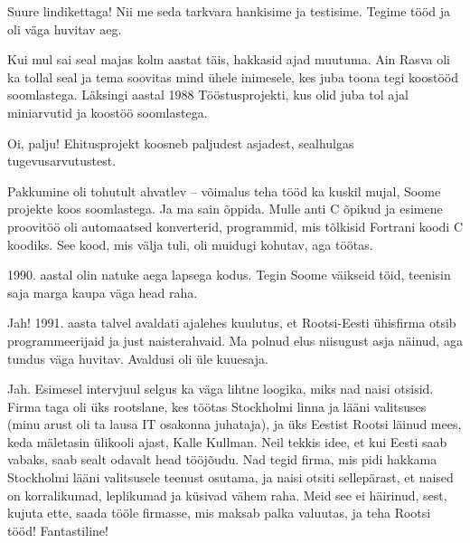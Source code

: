 
Suure lindikettaga! Nii me seda tarkvara hankisime ja testisime. Tegime tööd ja 
oli väga huvitav aeg.

Kui mul sai seal majas kolm aastat täis, hakkasid ajad muutuma. Ain 
Rasva oli ka tollal seal ja tema soovitas mind 
ühele inimesele, kes juba toona tegi koostööd soomlastega. Läksingi aastal 1988 Tööstusprojekti, kus olid juba tol ajal miniarvutid ja koostöö soomlastega. 


Oi, palju! Ehitusprojekt koosneb paljudest asjadest, sealhulgas 
tugevusarvutustest.


Pakkumine oli tohutult ahvatlev -- võimalus teha tööd ka kuskil mujal, 
Soome projekte koos 
soomlastega. Ja ma sain õppida. Mulle anti C õpikud ja 
esimene proovitöö oli automaatsed konverterid, programmid, mis tõlkisid
Fortrani koodi C koodiks. See kood, mis 
välja tuli, oli muidugi kohutav, aga töötas. 

1990. aastal olin natuke aega lapsega kodus. Tegin Soome väikseid töid, teenisin 
saja marga kaupa väga head raha. 


Jah! 1991. aasta talvel avaldati ajalehes 
kuulutus, et Rootsi-Eesti ühisfirma otsib programmeerijaid ja just naisterahvaid. Ma polnud elus niisugust asja näinud, aga tundus väga 
huvitav. Avaldusi oli üle kuuesaja. 


Jah. Esimesel intervjuul selgus ka väga lihtne loogika, miks nad naisi 
otsisid. Firma taga oli üks rootslane, kes töötas Stockholmi linna ja 
lääni valitsuses (minu arust oli ta lausa IT osakonna juhataja), ja üks Eestist Rootsi läinud mees, keda mäletasin ülikooli ajast, 
Kalle Kullman. Neil tekkis idee, et kui Eesti saab 
vabaks, saab sealt odavalt head tööjõudu. Nad tegid firma, mis pidi hakkama 
Stockholmi lääni valitsusele teenust osutama, ja naisi otsiti sellepärast, et 
naised on korralikumad, leplikumad ja küsivad vähem raha. Meid see 
ei häirinud, sest, kujuta ette, saada tööle firmasse, mis maksab palka 
valuutas, ja teha Rootsi tööd! Fantastiline!

